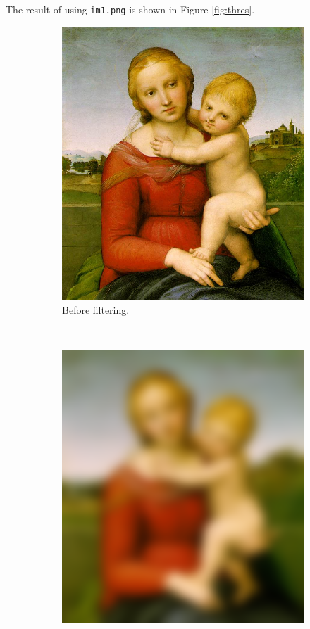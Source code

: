 \documentclass[two column]{article}
\begin{document}
The result of using \texttt{im1.png} is shown in Figure
\ref{fig:thres}. 

\begin{figure}[h]
  \centering
  \begin{subfigure}{0.3\textwidth}
    \includegraphics[width=\textwidth]{im1.png}
    \caption{Before filtering.}
  \end{subfigure}
  ~%
  \begin{subfigure}{0.3\textwidth}
    \includegraphics[width=\textwidth]{im1test.png}

\end{subfigure}
\end{figure}
\end{document}
